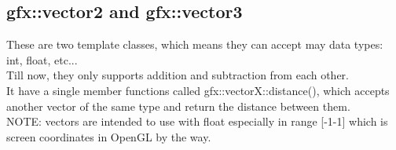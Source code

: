 \subsection{gfx::vector2 and gfx::vector3}
These are two template classes, which means they can accept may data types: int, float, etc...\\
Till now, they only supports addition and subtraction from each other. \\
It have a single member functions called gfx::vectorX::distance(), which accepts another vector 
of the same type and return the distance between them. \\
NOTE: vectors are intended to use with float especially in range [-1-1] which is screen coordinates in OpenGL by the way.
